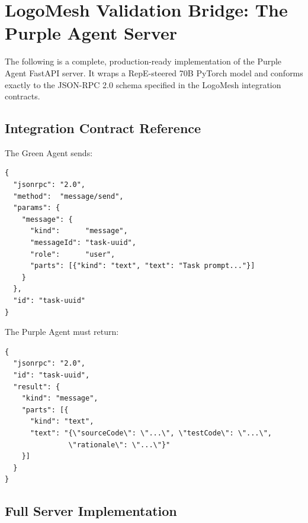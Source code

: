 \documentclass[11pt, a4paper]{article}
\begin{document}
\section{LogoMesh Validation Bridge: The Purple Agent Server}

The following is a complete, production-ready implementation of the Purple Agent
FastAPI server. It wraps a RepE-steered 70B PyTorch model and conforms exactly
to the JSON-RPC 2.0 schema specified in the LogoMesh integration contracts.

\subsection{Integration Contract Reference}

The Green Agent sends:

\begin{codebox}
\begin{lstlisting}[style=json]
{
  "jsonrpc": "2.0",
  "method":  "message/send",
  "params": {
    "message": {
      "kind":      "message",
      "messageId": "task-uuid",
      "role":      "user",
      "parts": [{"kind": "text", "text": "Task prompt..."}]
    }
  },
  "id": "task-uuid"
}
\end{lstlisting}
\end{codebox}

The Purple Agent must return:

\begin{codebox}
\begin{lstlisting}[style=json]
{
  "jsonrpc": "2.0",
  "id": "task-uuid",
  "result": {
    "kind": "message",
    "parts": [{
      "kind": "text",
      "text": "{\"sourceCode\": \"...\", \"testCode\": \"...\",
               \"rationale\": \"...\"}"
    }]
  }
}
\end{lstlisting}
\end{codebox}

\subsection{Full Server Implementation}
\end{document}
